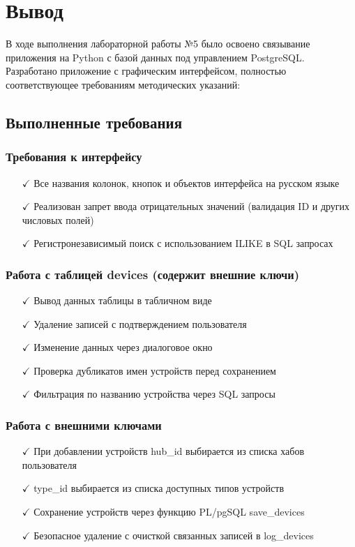 \documentclass[oneside,a4paper,14pt]{extarticle}
\begin{document}
\section*{Вывод}

В ходе выполнения лабораторной работы №5 было освоено связывание приложения на Python с базой данных под управлением PostgreSQL. Разработано приложение с графическим интерфейсом, полностью соответствующее требованиям методических указаний:

\subsection*{Выполненные требования}

\subsubsection*{Требования к интерфейсу}
\begin{itemize}
  \item[$\checkmark$] Все названия колонок, кнопок и объектов интерфейса на русском языке
  \item[$\checkmark$] Реализован запрет ввода отрицательных значений (валидация ID и других числовых полей)
  \item[$\checkmark$] Регистронезависимый поиск с использованием ILIKE в SQL запросах
\end{itemize}

\subsubsection*{Работа с таблицей devices (содержит внешние ключи)}
\begin{itemize}
  \item[$\checkmark$] Вывод данных таблицы в табличном виде
  \item[$\checkmark$] Удаление записей с подтверждением пользователя
  \item[$\checkmark$] Изменение данных через диалоговое окно
  \item[$\checkmark$] Проверка дубликатов имен устройств перед сохранением
  \item[$\checkmark$] Фильтрация по названию устройства через SQL запросы
\end{itemize}

\subsubsection*{Работа с внешними ключами}
\begin{itemize}
  \item[$\checkmark$] При добавлении устройств hub\_id выбирается из списка хабов пользователя
  \item[$\checkmark$] type\_id выбирается из списка доступных типов устройств
  \item[$\checkmark$] Сохранение устройств через функцию PL/pgSQL save\_devices
  \item[$\checkmark$] Безопасное удаление с очисткой связанных записей в log\_devices
\end{itemize}
\end{document}
